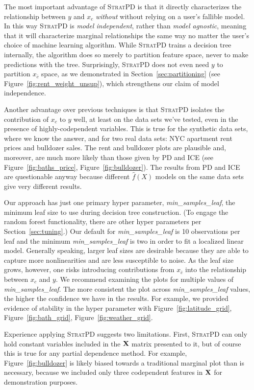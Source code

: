 \documentclass[12pt]{article}
\newcommand{\secref}[1]{Section~\ref{#1}}
\newcommand{\figref}[1]{Figure~\ref{#1}}
\newcommand{\spd}{\fontfamily{cmr}\textsc{\small StratPD}}
\newcommand{\xnc}{$x_{\overline{c}}$}
\begin{document}
The most important advantage of \spd{} is that it directly characterizes the relationship between $y$ and $x_c$ \emph{without} without relying on a user's fallible model. In this way \spd{} is {\em model independent}, rather than {\em model agnostic}, meaning that it will characterize marginal relationships the same way no matter the user's choice of machine learning algorithm.  While \spd{} trains a decision tree internally, the algorithm does so merely to partition feature space, never to make predictions with the tree. Surprisingly, \spd{} does not even need $y$ to  partition \xnc{} space, as we demonstrated in \secref{sec:partitioning} (see \figref{fig:rent_weight_unsup}), which strengthens our claim of model independence. 

Another advantage over previous techniques is that \spd{} isolates the contribution of $x_c$ to $y$ well, at least on the data sets we've tested, even in the presence of highly-codependent variables. This is true for the synthetic data sets, where we know the answer, and for two real data sets: NYC apartment rent prices and bulldozer sales. The rent and bulldozer plots are plausible and, moreover, are much more likely than those given by PD and ICE (see \figref{fig:baths_price}, \figref{fig:bulldozer}).  The results from PD and ICE are questionable anyway because different $\widehat{f}(X)$ models on the same data sets give very different results.

Our approach has just one primary hyper parameter, {\it min\_samples\_leaf}, the minimum leaf size to use during decision tree construction. (To engage the random forest functionality, there are other hyper parameters per \secref{sec:tuning}.) Our default for {\it min\_samples\_leaf} is 10 observations per leaf and the minimum {\it min\_samples\_leaf} is two in order to fit a localized linear model.  Generally speaking, larger leaf sizes are desirable because they are able to capture more nonlinearities and are less susceptible to noise.  As the leaf size grows, however, one risks introducing contributions from \xnc{} into the relationship between $x_c$ and $y$. We recommend examining the plots  for multiple values of {\it min\_samples\_leaf}. The more consistent the plot across {\it min\_samples\_leaf} values, the higher the confidence we have in the results. For example, we provided evidence of stability in the hyper parameter with \figref{fig:latitude_grid}, \figref{fig:bath_grid}, \figref{fig:weather_grid}. 

Experience applying \spd{} suggests two limitations. First, \spd{} can only hold constant variables included in the $\bf X$ matrix presented to it, but of course this is true for any partial dependence method. For example, \figref{fig:bulldozer} is likely biased towards a traditional marginal plot than is necessary, because we included only three codependent features in $\bf X$ for demonstration purposes.  
\end{document}

